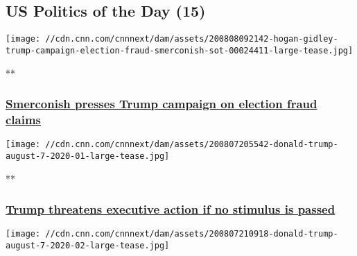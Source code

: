 \hypertarget{us-politics-of-the-day-15}{%
\subsection{US Politics of the Day
(15)}\label{us-politics-of-the-day-15}}

\href{/videos/politics/2020/08/08/hogan-gidley-trump-campaign-election-fraud-smerconish-sot.cnn/video/playlists/this-week-in-politics/}{}

\texttt{[image: //cdn.cnn.com/cnnnext/dam/assets/200808092142-hogan-gidley-trump-campaign-election-fraud-smerconish-sot-00024411-large-tease.jpg]}

**

\hypertarget{smerconish-presses-trump-campaign-on-election-fraud-claims-}{%
\subsubsection{\texorpdfstring{\href{/videos/politics/2020/08/08/hogan-gidley-trump-campaign-election-fraud-smerconish-sot.cnn/video/playlists/this-week-in-politics/}{Smerconish
presses Trump campaign on election fraud claims
}}{Smerconish presses Trump campaign on election fraud claims }}\label{smerconish-presses-trump-campaign-on-election-fraud-claims-}}

\href{/videos/politics/2020/08/08/trump-coronavirus-stimulus-executive-action-acosta-haberman-ac360-sot-vpx.cnn/video/playlists/this-week-in-politics/}{}

\texttt{[image: //cdn.cnn.com/cnnnext/dam/assets/200807205542-donald-trump-august-7-2020-01-large-tease.jpg]}

**

\hypertarget{trump-threatens-executive-action-if-no-stimulus-is-passed}{%
\subsubsection{\texorpdfstring{\href{/videos/politics/2020/08/08/trump-coronavirus-stimulus-executive-action-acosta-haberman-ac360-sot-vpx.cnn/video/playlists/this-week-in-politics/}{Trump
threatens executive action if no stimulus is
passed}}{Trump threatens executive action if no stimulus is passed}}\label{trump-threatens-executive-action-if-no-stimulus-is-passed}}

\href{/videos/politics/2020/08/08/haberman-trump-stimulus-executive-orders-bad-optics-backfire-sot-ac360-vpx.cnn/video/playlists/this-week-in-politics/}{}

\texttt{[image: //cdn.cnn.com/cnnnext/dam/assets/200807210918-donald-trump-august-7-2020-02-large-tease.jpg]}

